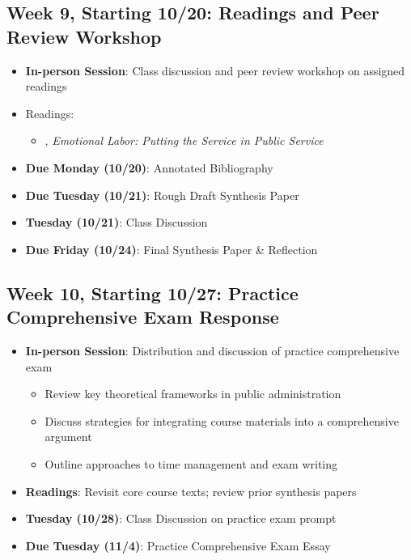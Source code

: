 \documentclass[12pt]{article}     %
\begin{document}
\subsection*{Week 9, Starting 10/20: Readings and Peer Review Workshop}
\begin{itemize}
    \item \textbf{In-person Session}: Class discussion and peer review workshop on assigned readings
    \item Readings:
        \begin{itemize}
            \item \cite{guy2008}, \emph{Emotional Labor: Putting the Service in Public Service}
        \end{itemize}
    \item \textbf{Due Monday (10/20)}: Annotated Bibliography
    \item \textbf{Due Tuesday (10/21)}: Rough Draft Synthesis Paper
    \item \textbf{Tuesday (10/21)}: Class Discussion
    \item \textbf{Due Friday (10/24)}: Final Synthesis Paper \& Reflection
\end{itemize}

\subsection*{Week 10, Starting 10/27: Practice Comprehensive Exam Response}
\begin{itemize}
    \item \textbf{In-person Session}: Distribution and discussion of practice comprehensive exam
    \begin{itemize}
        \item Review key theoretical frameworks in public administration
        \item Discuss strategies for integrating course materials into a comprehensive argument
        \item Outline approaches to time management and exam writing
    \end{itemize}
    \item \textbf{Readings}: Revisit core course texts; review prior synthesis papers
    \item \textbf{Tuesday (10/28)}: Class Discussion on practice exam prompt
    \item \textbf{Due Tuesday (11/4)}: Practice Comprehensive Exam Essay 
\end{itemize}
\end{document}
